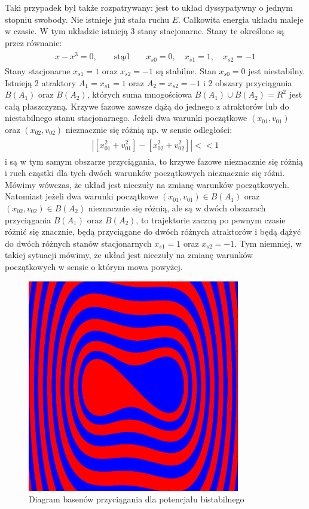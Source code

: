 \documentclass[a4paper,12pt,polish]{sphinxmanual}
\begin{document}
Taki przypadek był także rozpatrywany: jest to układ dyssypatywny o jednym stopniu swobody. Nie istnieje już stała ruchu $E$.  Całkowita energia układu maleje w czasie.  W tym układzie  istnieją 3 stany stacjonarne. Stany te określone są przez równanie:
\label{ch2/chII011:equation-eqn14}\begin{gather}
\begin{split}x-x^3=0, \qquad \mbox{stąd} \qquad x_{s0}=0, \quad x_{s1} = 1, \quad x_{s2} = -1\end{split}\label{ch2/chII011-eqn14}
\end{gather}
Stany stacjonarne $x_{s1} = 1$ oraz $x_{s2} = -1$  są  stabilne. Stan $x_{s0}=0$ jest niestabilny. Istnieją 2 atraktory  $A_1= x_{s1} = 1$ oraz $A_2= x_{s2} = -1$ i  2 obszary przyciągania $B(A_1)$ oraz $B(A_2)$, których suma mnogościowa $B(A_1) \cup  B(A_2) = R^2$ jest całą płaszczyzną.  Krzywe fazowe  zawsze dążą do jednego z atraktorów lub do niestabilnego stanu stacjonarnego. Jeżeli dwa warunki początkowe $(x_{01}, v_{01})$  oraz  $(x_{02}, v_{02})$ nieznacznie się różnią np. w sensie odległości:
\label{ch2/chII011:equation-eqn15}\begin{gather}
\begin{split}| [x_{01}^2 +  v_{01}^2] - [x_{02}^2 +  v_{02}^2] | << 1\end{split}\label{ch2/chII011-eqn15}
\end{gather}
i są w tym samym obszarze przyciągania, to krzywe fazowe nieznacznie się różnią i ruch cząstki dla tych dwóch warunków początkowych nieznacznie się różni. Mówimy wówczas, że układ jest nieczuły na zmianę warunków początkowych. Natomiast jeżeli dwa warunki początkowe $(x_{01}, v_{01}) \in B(A_1)$  oraz  $(x_{02}, v_{02}) \in B(A_2)$ nieznacznie się różnią, ale są w dwóch obszarach przyciągania $B(A_1)$ oraz $B(A_2)$, to trajektorie zaczną po pewnym czasie różnić się znacznie, będą przyciągane do dwóch różnych atraktorów  i będą dążyć  do dwóch różnych stanów stacjonarnych $x_{s1} = 1$ oraz $x_{s2} = -1$. Tym niemniej, w takiej sytuacji mówimy, że układ jest nieczuły na zmianę warunków początkowych w sensie o którym mowa powyżej.
\begin{figure}[htbp]
\centering
\capstart

\includegraphics{baseny_tarcie.jpg}
\caption{Diagram basenów przyciągania dla potencjału bistabilnego}\end{figure}
\end{document}
